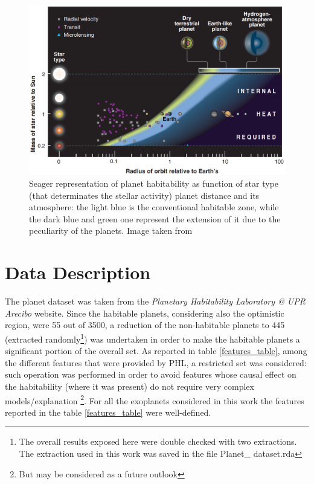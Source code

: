 \documentclass[
12pt, %
a4paper, %
oneside, %
headinclude,footinclude, %
BCOR5mm, %
]{scrartcl}
\begin{document}
\begin{figure}[h]
\begin{center}
\includegraphics[width=1\textwidth]{Pic/Planets_habitability_Seager.png}
\caption{Seager representation of planet habitability as function of star type (that determinates the stellar activity) planet distance and its atmosphere: the light blue is the conventional habitable zone, while the dark blue and green one represent the extension of it due to the peculiarity of the planets. Image taken from \cite{seager2013exoplanet}}
\label{Planets_habitability_Seager}
\end{center}
\end{figure}


\clearpage

\section{Data Description}

The planet dataset was taken from the \textit{Planetary Habitability Laboratory @ UPR Arecibo} \cite{planet_dataset} website. Since the habitable planets, considering also the optimistic region, were  55 out of 3500, a reduction of the non-habitable planets to 445 (extracted randomly\footnote{The overall results exposed here were double checked with two extractions. The extraction used in this work was saved in the file Planet\_ dataset.rda }) was undertaken in order to make the habitable planets a significant portion of the overall set. As reported in table \ref{features_table}, among the different features that were provided by PHL, a restricted set was considered: such operation was performed in order to avoid features whose causal effect on the habitability (where it was present) do not require very complex models/explanation \footnote{But may be considered as a future outlook}. For all the exoplanets considered in this work the features reported in the table \ref{features_table} were well-defined. 
 
\end{document}
